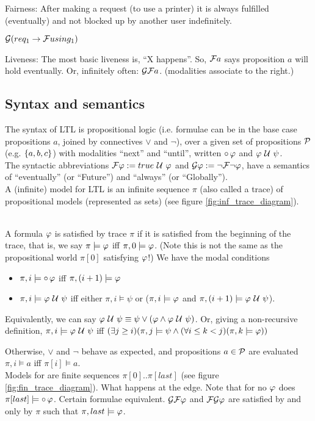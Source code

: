 Fairness:
After making a request (to use a printer) it is always fulfilled (eventually)
and not blocked up by another user indefinitely.
\begin{center}
  $\mathcal{G}(req_1 \to \mathcal{F} using_1)$


Liveness:
The most basic liveness is, ``X happens''. So, $\mathcal{F} a$ says proposition $a$ will hold eventually.
Or, infinitely often: $\mathcal{G} \mathcal{F} a$. (modalities associate to the right.)
\subsection{Syntax and semantics}
The syntax of LTL is propositional logic
(i.e. formulae can be in the base case propositions $a$,
joined by connectives $\lor$ and $\neg$),
over a given set of propositions
$\mathcal{P}$ (e.g. $\{a,b,c\}$) with modalities ``next'' and ``until'', written
$\circ\, \varphi$ and $\varphi \ \mathcal{U}\  \psi$.
\\The syntactic abbreviations
$\mathcal{F} \varphi := true \ \mathcal{U}\  \varphi$ and
$\mathcal{G} \varphi := \neg \mathcal{F} \neg \varphi$,
have a semantics of ``eventually'' (or ``Future'')
and ``always'' (or ``Globally'').
\\A (infinite) model for LTL is an infinite sequence
$\pi$ (also called a trace) of propositional models (represented as sets) (see figure \ref{fig:inf_trace_diagram}).


\\A formula $\varphi$ is satisfied by trace $\pi$ if it is satisfied
from the beginning of the trace, that is,
we say $\pi \models \varphi$ iff $\pi, 0 \models \varphi$.
(Note this is not the same as the
propositional world $\pi[0]$ satisfying $\varphi$!)
We have the modal conditions
\\
\begin{itemize}
\item$\pi, i \models \circ\,\varphi$ iff $\pi, (i+1) \models\varphi$
\item $\pi, i \models \varphi\ \mathcal{U}\ \psi$ iff
either $\pi, i \models \psi$ or
($\pi, i \models \varphi$ and $\pi, (i+1) \models \varphi\ \mathcal{U}\ \psi$).
\end{itemize}
Equivalently, we can say $\varphi\ \mathcal{U}\ \psi \equiv
\psi \lor (\varphi \land \varphi\ \mathcal{U}\ \psi)$.
Or, giving a non-recursive definition,
$\pi, i \models \varphi \ \mathcal{U}\  \psi$ iff
$(\exists j \geq i)
(\pi,j \models \psi \land
(\forall i \leq k < j) (\pi, k \models \varphi))$

Otherwise, $\lor$ and $\neg$ behave as expected, and propositions $a \in \mathcal{P}$ are evaluated
$\pi,i \models a$ iff $\pi[i] \models a$.
\\Models for \ltlf are finite sequences $\pi[0]..\pi[last]$ (see figure \ref{fig:fin_trace_diagram}).
What happens at the edge.
Note that for no $\varphi$ does $\pi[last] \models \circ\,\varphi$.
Certain formulae equivalent. $\mathcal{G} \mathcal{F} \varphi$ and
$\mathcal{F} \mathcal{G} \varphi$ are satisfied by and only by $\pi$ such that $\pi, last \models \varphi$.



\end{center}
